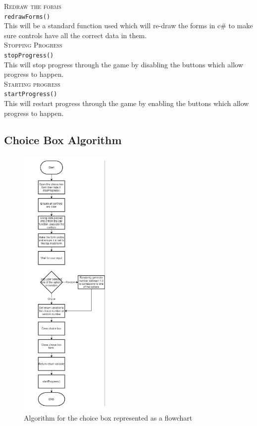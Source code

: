 \noindent \textsc{Redraw the forms}\\
\verb|redrawForms()|\\
This will be a standard function used which will re-draw the forms in c\# to make sure controls have all the correct data in them.\\

\noindent \textsc{Stopping Progress}\\
\verb|stopProgress()|\\
This will stop progress through the game by disabling the buttons which allow progress to happen.\\

\noindent \textsc{Starting progress}\\
\verb|startProgress()|\\
This will restart progress through the game by enabling the buttons which allow progress to happen.\\

\subsection{Choice Box Algorithm}
\begin{figure}[H]
    \centering
    \includegraphics[width=0.4\textwidth]{images/design/choiceBoxAlgorithm.png}
    \caption{Algorithm for the choice box represented as a flowchart}
    \label{fig:design-choiceBoxAlgorithm}
\end{figure}
